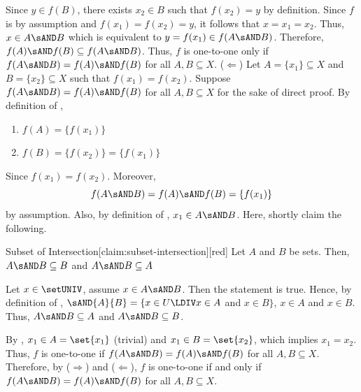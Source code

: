 \begin{enumerate}
\begin{enumerate}
\begin{subprove}
      Since $y \in f(B)$, there exists $x_2 \in B$ such that $f(x_2) = y$ by definition.
      Since $f$ is  by assumption and $f(x_1) = f(x_2) = y$, it follows that $x=x_1 = x_2$.
      Thus, $x \in A \sAND B$ which is equivalent to $y = f(x_1) \in f(A \sAND B)$.
      Therefore, $f(A) \sAND f(B) \subseteq f(A \sAND B)$.\proofstep
      Thus, $f$ is one-to-one only if $f(A \sAND B)=f(A) \sAND f(B)$ for all $A, B \subseteq X$.\proofstep
      ($\Leftarrow$) Let $A = \{x_1\} \subseteq X$ and $B = \{x_2\} \subseteq X$ such that $f(x_1) = f(x_2)$.
      Suppose $f(A \sAND B)=f(A) \sAND f(B)$ for all $A, B \subseteq X$ for the sake of direct proof.
      By definition of ,
      \begin{enumerate}
        \item $f(A) = \{f(x_1)\}$
        \item $f(B) = \{f(x_2)\} = \{f(x_1)\}$
      \end{enumerate}
      Since $f(x_1) = f(x_2)$. Moreover,
      $$f(A \sAND B) = f(A) \sAND f(B) = \{f(x_1)\}$$ by assumption. 
      Also, by definition of , $x_1 \in A \sAND B$.
      Here, shortly claim the following.
      \begin{define}{Subset of Intersection}[claim:subset-intersection][red]
        Let $A$ and $B$ be sets. Then, $A \sAND B \subseteq B$ and $A \sAND B \subseteq A$
        \begin{subprove}[red]
          Let $x\in \setUNIV$, assume $x\in A \sAND B$. Then the statement  is true.
          Hence, by definition of , $\sAND{A}{B}=\{x\in U\LDIV x\in A$ and $x\in B\}$, $x\in A$ and $x\in B$.
          Thus, $A \sAND B \subseteq A$ and $A \sAND B \subseteq B$.
        \end{subprove}
      \end{define}
      By , $x_1 \in A=\set{x_1}$ (trivial) 
      and $x_1 \in B=\set{x_2}$, which implies $x_1 = x_2$.\proofstep
      Thus, $f$ is one-to-one if $f(A \sAND B)=f(A) \sAND f(B)$ for all $A, B \subseteq X$.\proofstep
      Therefore, by ($\Rightarrow$) and ($\Leftarrow$), $f$ is one-to-one 
      if and only if $f(A \sAND B)=f(A) \sAND f(B)$ for all $A, B \subseteq X$.
    \end{subprove}
  \end{enumerate}
\end{enumerate}

















